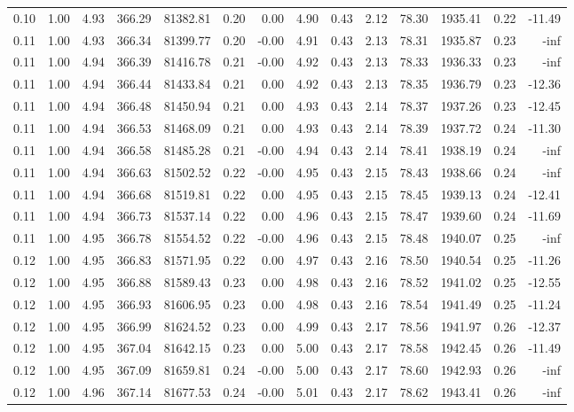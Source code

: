 \begin{table}[!ht]
\begin{tabular}{rrrrrrrrrrrrrr}
0.10 & 1.00 & 4.93 & 366.29 & 81382.81 & 0.20 & 0.00 & 4.90 & 0.43 & 2.12 & 78.30 & 1935.41 & 0.22 & -11.49 \\
0.11 & 1.00 & 4.93 & 366.34 & 81399.77 & 0.20 & -0.00 & 4.91 & 0.43 & 2.13 & 78.31 & 1935.87 & 0.23 & -inf \\
0.11 & 1.00 & 4.94 & 366.39 & 81416.78 & 0.21 & -0.00 & 4.92 & 0.43 & 2.13 & 78.33 & 1936.33 & 0.23 & -inf \\
0.11 & 1.00 & 4.94 & 366.44 & 81433.84 & 0.21 & 0.00 & 4.92 & 0.43 & 2.13 & 78.35 & 1936.79 & 0.23 & -12.36 \\
0.11 & 1.00 & 4.94 & 366.48 & 81450.94 & 0.21 & 0.00 & 4.93 & 0.43 & 2.14 & 78.37 & 1937.26 & 0.23 & -12.45 \\
0.11 & 1.00 & 4.94 & 366.53 & 81468.09 & 0.21 & 0.00 & 4.93 & 0.43 & 2.14 & 78.39 & 1937.72 & 0.24 & -11.30 \\
0.11 & 1.00 & 4.94 & 366.58 & 81485.28 & 0.21 & -0.00 & 4.94 & 0.43 & 2.14 & 78.41 & 1938.19 & 0.24 & -inf \\
0.11 & 1.00 & 4.94 & 366.63 & 81502.52 & 0.22 & -0.00 & 4.95 & 0.43 & 2.15 & 78.43 & 1938.66 & 0.24 & -inf \\
0.11 & 1.00 & 4.94 & 366.68 & 81519.81 & 0.22 & 0.00 & 4.95 & 0.43 & 2.15 & 78.45 & 1939.13 & 0.24 & -12.41 \\
0.11 & 1.00 & 4.94 & 366.73 & 81537.14 & 0.22 & 0.00 & 4.96 & 0.43 & 2.15 & 78.47 & 1939.60 & 0.24 & -11.69 \\
0.11 & 1.00 & 4.95 & 366.78 & 81554.52 & 0.22 & -0.00 & 4.96 & 0.43 & 2.15 & 78.48 & 1940.07 & 0.25 & -inf \\
0.12 & 1.00 & 4.95 & 366.83 & 81571.95 & 0.22 & 0.00 & 4.97 & 0.43 & 2.16 & 78.50 & 1940.54 & 0.25 & -11.26 \\
0.12 & 1.00 & 4.95 & 366.88 & 81589.43 & 0.23 & 0.00 & 4.98 & 0.43 & 2.16 & 78.52 & 1941.02 & 0.25 & -12.55 \\
0.12 & 1.00 & 4.95 & 366.93 & 81606.95 & 0.23 & 0.00 & 4.98 & 0.43 & 2.16 & 78.54 & 1941.49 & 0.25 & -11.24 \\
0.12 & 1.00 & 4.95 & 366.99 & 81624.52 & 0.23 & 0.00 & 4.99 & 0.43 & 2.17 & 78.56 & 1941.97 & 0.26 & -12.37 \\
0.12 & 1.00 & 4.95 & 367.04 & 81642.15 & 0.23 & 0.00 & 5.00 & 0.43 & 2.17 & 78.58 & 1942.45 & 0.26 & -11.49 \\
0.12 & 1.00 & 4.95 & 367.09 & 81659.81 & 0.24 & -0.00 & 5.00 & 0.43 & 2.17 & 78.60 & 1942.93 & 0.26 & -inf \\
0.12 & 1.00 & 4.96 & 367.14 & 81677.53 & 0.24 & -0.00 & 5.01 & 0.43 & 2.17 & 78.62 & 1943.41 & 0.26 & -inf \\

\end{tabular}
\end{table}
